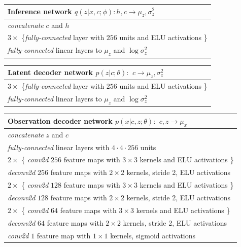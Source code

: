 \documentclass{article} %
\begin{document}
\begin{table}[H]

    \begin{tabular}{  l}
    \bf{Inference network} $q(z | x,c ; \phi): h,c \to \mu_z, \sigma^2_z$ \\ \hline
    \emph{concatenate} $c$ and $h$ \\
    $3 \times$ \{\emph{fully-connected} layer with $256$ units and ELU activations \}\\
    \emph{fully-connected} linear layers to $\mu_z$ and $\log \sigma^2_z$
    \label{table:omniglot_inference_network}
    \end{tabular}
\end{table}
\begin{table}[H]

    \begin{tabular}{  l}
    \bf{Latent decoder network} $p(z | c; \theta):$ $c \to \mu_z, \sigma^2_z$ \\ \hline
    $3 \times$ \{\emph{fully-connected} layer with $256$ units and ELU activations \}\\
    \emph{fully-connected} linear layers to $\mu_z$ and $\log \sigma^2_z$
    \label{table:omniglot_latent_decoder_network}
    \end{tabular}   
\end{table}

\begin{table}[H]

    \begin{tabular}{  l}
    \bf{Observation decoder network} $p(x | c, z ; \theta):$ $c,z \to \mu_x$ \\ \hline
    \emph{concatenate} $z$ and $c$ \\
    \emph{fully-connected} linear layers with $4 \cdot 4 \cdot 256$ units \\
    $2 \times$ \{ \emph{conv2d} $256$ feature maps with $3 \times 3$ kernels and ELU activations \} \\
    \emph{deconv2d} $256$ feature maps with $2 \times 2$ kernels, stride 2, ELU activations \\
     $2 \times$ \{ \emph{conv2d} $128$ feature maps with $3 \times 3$ kernels and ELU activations \} \\
    \emph{deconv2d} $128$ feature maps with $2 \times 2$ kernels, stride 2, ELU activations \\   
    $2 \times$ \{ \emph{conv2d} $64$ feature maps with $3 \times 3$ kernels and ELU activations \} \\
    \emph{deconv2d} $64$ feature maps with $2 \times 2$ kernels, stride 2, ELU activations \\
    \emph{conv2d} $1$ feature map with $1 \times 1$ kernels, sigmoid activations
    \label{table:omniglot_observation_decoder_network}
    \end{tabular}   
\end{table}
\end{document}
